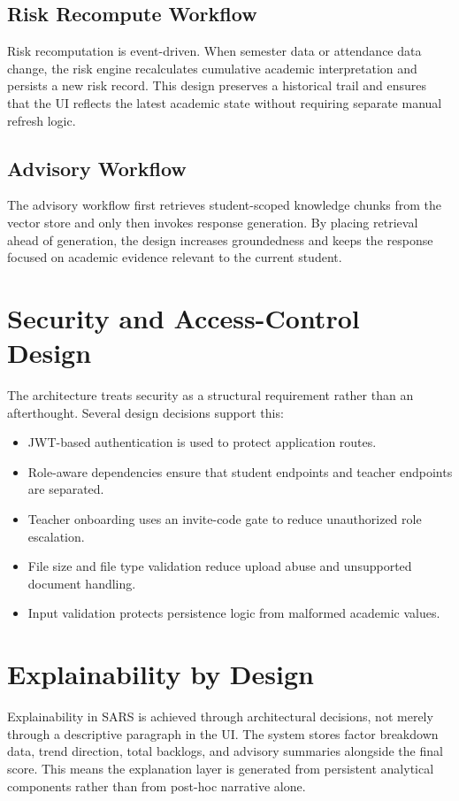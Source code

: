 \subsection{Risk Recompute Workflow}
Risk recomputation is event-driven. When semester data or attendance data change, the risk engine recalculates cumulative academic interpretation and persists a new risk record. This design preserves a historical trail and ensures that the UI reflects the latest academic state without requiring separate manual refresh logic.

\subsection{Advisory Workflow}
The advisory workflow first retrieves student-scoped knowledge chunks from the vector store and only then invokes response generation. By placing retrieval ahead of generation, the design increases groundedness and keeps the response focused on academic evidence relevant to the current student.

\section{Security and Access-Control Design}
The architecture treats security as a structural requirement rather than an afterthought. Several design decisions support this:
\begin{itemize}[leftmargin=*]
\item JWT-based authentication is used to protect application routes.
\item Role-aware dependencies ensure that student endpoints and teacher endpoints are separated.
\item Teacher onboarding uses an invite-code gate to reduce unauthorized role escalation.
\item File size and file type validation reduce upload abuse and unsupported document handling.
\item Input validation protects persistence logic from malformed academic values.
\end{itemize}

\section{Explainability by Design}
Explainability in SARS is achieved through architectural decisions, not merely through a descriptive paragraph in the UI. The system stores factor breakdown data, trend direction, total backlogs, and advisory summaries alongside the final score. This means the explanation layer is generated from persistent analytical components rather than from post-hoc narrative alone.

